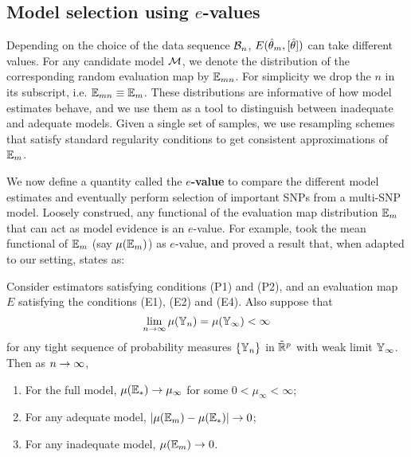 
\subsection{Model selection using $e$-values}
\label{subsec:meanEvalue}
Depending on the choice of the data sequence $\mathcal{B}_n$, $E( \hat {{\theta}}_m, [\hat {{\theta}}])$ can take different values. For any candidate model $\mathcal{M}$, we denote the distribution of the corresponding random evaluation map by $\mathbb{E}_{m n}$. For simplicity we drop the $n$ in its subscript, i.e. $\mathbb{E}_{m n} \equiv \mathbb{E}_m$. These distributions are informative of how model estimates behave, and we use them as a tool to distinguish between inadequate and adequate models. Given a single set of samples, we use resampling schemes that satisfy standard regularity conditions \citep{MajumdarChatterjee17} to get consistent approximations of $\mathbb{E}_{m}$.

We now define a quantity called the \textbf{$e$-value} to compare the different model estimates and eventually perform selection of important SNPs from a multi-SNP model. Loosely construed, any functional of the evaluation map distribution $\mathbb{E}_{m}$ that can act as model evidence is an $e$-value. For example, \cite{MajumdarChatterjee17} took the mean functional of $\mathbb{E}_{m }$ (say $\mu (\mathbb{E}_{m })$) as $e$-value, and proved a result that, when adapted to our setting, states as:

\begin{Theorem}\label{thm:meanThm}
Consider estimators satisfying conditions (P1) and (P2), and an evaluation map $E$ satisfying the conditions (E1), (E2) and (E4). Also suppose that
%
$$
\lim_{n \rightarrow \infty} \mu ( \mathbb{Y}_n ) = \mu ( \mathbb{Y}_\infty) < \infty
$$
%
for any tight sequence of probability measures $\{ \mathbb{Y}_n \}$ in $\tilde {\mathbb{R}}^p$ with weak limit $\mathbb{Y}_\infty$. Then as $n \rightarrow \infty$,

\begin{enumerate}
\item For the full model, $\mu (\mathbb{E}_{* }) \rightarrow \mu_\infty$ for some $0 < \mu_\infty < \infty$;
\item For any adequate model, $| \mu ( \mathbb{E}_{m } ) - \mu (\mathbb{E}_{* }) | \rightarrow 0$;
\item For any inadequate model, $ \mu ( \mathbb{E}_{m }) \rightarrow 0$.
\end{enumerate}
\end{Theorem}

